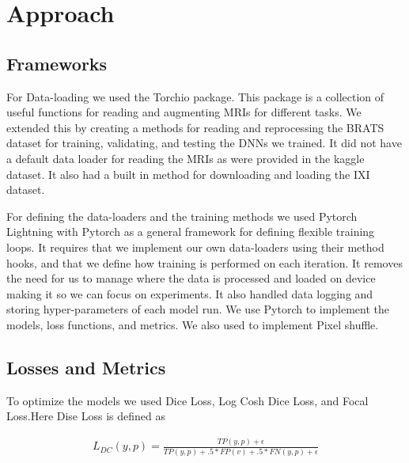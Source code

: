 \documentclass[10pt,twocolumn,letterpaper]{article}
\begin{document}

\section{Approach}

\subsection{Frameworks}


For Data-loading we used the Torchio\cite{tio} package. This package is a collection of useful functions for reading and augmenting MRIs for different tasks. We extended this by creating a methods for reading and reprocessing the BRATS dataset for training, validating, and testing the DNNs we trained. It did not have a default data loader for reading the MRIs as were provided in the kaggle dataset. It also had a built in method for downloading and loading the IXI dataset. 

For defining the data-loaders and the training methods we used Pytorch Lightning\cite{PTL} with Pytorch \cite{PT} as a general framework for defining flexible training loops. It requires that we implement our own data-loaders using their method hooks, and that we define how training is performed on each iteration. It removes the need for us to manage where the data is processed and loaded on device making it so we can focus on experiments. It also handled data logging and storing hyper-parameters of each model run. We use Pytorch to implement the models, loss functions, and metrics. We also used to implement Pixel shuffle. 

\subsection{Losses and Metrics}

To optimize the models we used Dice Loss, Log Cosh Dice Loss, and Focal Loss.Here Dise Loss \cite{SEG} is defined as  

\begin{align}
 L_{DC}(y,p) = \frac{TP(y,p)  + \epsilon}{TP(y,p)  + .5* FP(v)  + .5*FN(y,p)    + \epsilon } 
\end{align}
\end{document}
